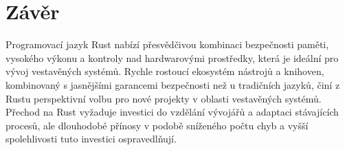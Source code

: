 \documentclass[
    language=czech,
    doctype=article,
]{../../omnilatex}
\begin{document}
\section{Závěr}
Programovací jazyk Rust nabízí přesvědčivou kombinaci bezpečnosti paměti, vysokého výkonu a kontroly nad hardwarovými prostředky, která je ideální pro vývoj vestavěných systémů. Rychle rostoucí ekosystém nástrojů a knihoven, kombinovaný s jasnějšími garancemi bezpečnosti než u tradičních jazyků, činí z Rustu perspektivní volbu pro nové projekty v oblasti vestavěných systémů. Přechod na Rust vyžaduje investici do vzdělání vývojářů a adaptaci stávajících procesů, ale dlouhodobé přínosy v podobě sníženého počtu chyb a vyšší spolehlivosti tuto investici ospravedlňují.
\end{document}

